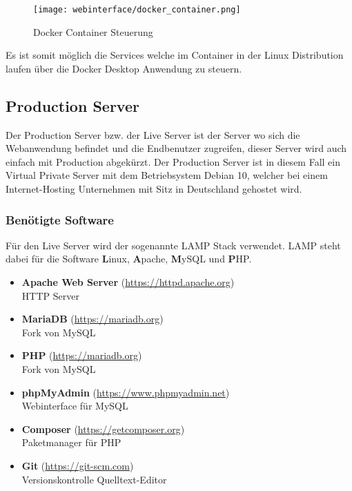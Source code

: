 \begin{figure}[H]
  \centering
  \texttt{[image: webinterface/docker\_container.png]}
  \caption{Docker Container Steuerung}
\end{figure}

Es ist somit möglich die Services welche im Container in der Linux Distribution
laufen über die Docker Desktop Anwendung zu steuern.

\subsection{Production Server}
Der Production Server bzw. der Live Server ist der Server wo sich die Webanwendung
befindet und die Endbenutzer zugreifen, dieser Server wird auch einfach mit
Production abgekürzt. Der Production Server ist in diesem Fall ein Virtual
Private Server mit dem Betriebsystem Debian 10, welcher bei einem
Internet-Hosting Unternehmen mit Sitz in Deutschland gehostet wird.

\subsubsection{Benötigte Software}

Für den Live Server wird der sogenannte \glqq LAMP\grqq{} Stack verwendet. LAMP steht dabei
für die Software \textbf{L}inux, \textbf{A}pache, \textbf{M}ySQL und \textbf{P}HP.

\begin{itemize}
  \item \textbf{Apache Web Server} (\url{https://httpd.apache.org}) \\ HTTP Server
  \item \textbf{MariaDB} (\url{https://mariadb.org}) \\ Fork von MySQL
  \item \textbf{PHP} (\url{https://mariadb.org}) \\ Fork von MySQL
  \item \textbf{phpMyAdmin} (\url{https://www.phpmyadmin.net}) \\ Webinterface
        für MySQL
  \item \textbf{Composer} (\url{https://getcomposer.org}) \\ Paketmanager für PHP
  \item \textbf{Git} (\url{https://git-scm.com}) \\ Versionskontrolle
        Quelltext-Editor
\end{itemize}

